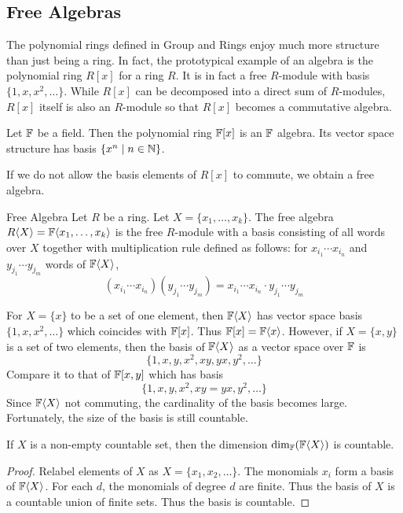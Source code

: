 \documentclass[a4paper]{article}
\begin{document}
\subsection{Free Algebras}
The polynomial rings defined in Group and Rings enjoy much more structure than just being a ring. In fact, the prototypical example of an algebra is the polynomial ring $R[x]$ for a ring $R$. It is in fact a free $R$-module with basis $\{1,x,x^2,\dots\}$. While $R[x]$ can be decomposed into a direct sum of $R$-modules, $R[x]$ itself is also an $R$-module so that $R[x]$ becomes a commutative algebra. 

\begin{prp}{}{} Let $\mathbb{F}$ be a field. Then the polynomial ring $\mathbb{F}[x]$ is an $\mathbb{F}$ algebra. Its vector space structure has basis $\{x^n\;|\;n\in\mathbb{N}\}$. 
\end{prp}

If we do not allow the basis elements of $R[x]$ to commute, we obtain a free algebra. 

\begin{defn}{Free Algebra}{} Let $R$ be a ring. Let $X=\{x_1,\dots,x_k\}$. The free algebra $R\langle X\rangle=\mathbb{F}\langle x_1,\dots,x_k\rangle$ is the free $R$-module with a basis consisting of all words over $X$ together with multiplication rule defined as follows: for $x_{i_1}\cdots x_{i_n}$ and $y_{j_1}\cdots y_{j_m}$ words of $\mathbb{F}\langle X\rangle$, $$(x_{i_1}\cdots x_{i_n})(y_{j_1}\cdots y_{j_m})=x_{i_1}\cdots x_{i_n}\cdot y_{j_1}\cdots y_{j_m}$$
\end{defn}

For $X=\{x\}$ to be a set of one element, then $\mathbb{F}\langle X\rangle$ has vector space basis $\{1,x,x^2,\dots\}$ which coincides with $\mathbb{F}[x]$. Thus $\mathbb{F}[x]=\mathbb{F}\langle x\rangle$. However, if $X=\{x,y\}$ is a set of two elements, then the basis of $\mathbb{F}\langle X\rangle$ as a vector space over $\mathbb{F}$ is $$\{1,x,y,x^2,xy,yx,y^2,\dots\}$$ Compare it to that of $\mathbb{F}[x,y]$ which has basis $$\{1,x,y,x^2,xy=yx,y^2,\dots\}$$ Since $\mathbb{F}\langle X\rangle$ not commuting, the cardinality of the basis becomes large. Fortunately, the size of the basis is still countable. 

\begin{prp}{}{} If $X$ is a non-empty countable set, then the dimension $\dim_{\mathbb{F}}(\mathbb{F}\langle X\rangle)$ is countable. \tcbline
\begin{proof}
Relabel elements of $X$ as $X=\{x_1,x_2,\dots\}$. The monomials $x_i$ form a basis of $\mathbb{F}\langle X\rangle$. For each $d$, the monomials of degree $d$ are finite. Thus the basis of $X$ is a countable union of finite sets. Thus the basis is countable. 
\end{proof}
\end{prp}
\end{document}
